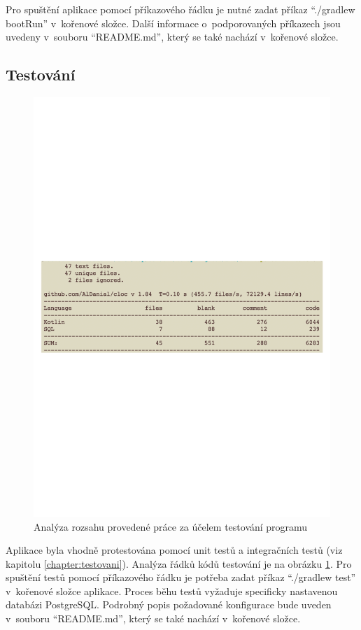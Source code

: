         Pro spuštění aplikace pomocí příkazového řádku je nutné zadat příkaz \enquote{./gradlew bootRun} v~kořenové složce. Další informace o~podporovaných příkazech jsou uvedeny v~souboru \enquote{README.md}, který se také nachází v~kořenové složce. 
        
    \subsection{Testování}
        \begin{figure}\centering
    	   \includegraphics[width=1.0\textwidth]{pdfs/CodeAmountTests2}
    	   \caption[Analýza kódu testů]{Analýza rozsahu provedené práce za účelem testování programu}\label{image:code-count-test}
        \end{figure}
        Aplikace byla vhodně protestována pomocí unit testů a integračních testů (viz kapitolu \ref{chapter:testovani}). Analýza řádků kódů testování je na obrázku \ref{image:code-count-test}. Pro spuštění testů pomocí příkazového řádku je potřeba zadat příkaz \enquote{./gradlew test} v~kořenové složce aplikace. Proces běhu testů vyžaduje specificky nastavenou databázi PostgreSQL.
        Podrobný popis požadované konfigurace bude uveden v~souboru \enquote{README.md}, který se také nachází v~kořenové složce.
